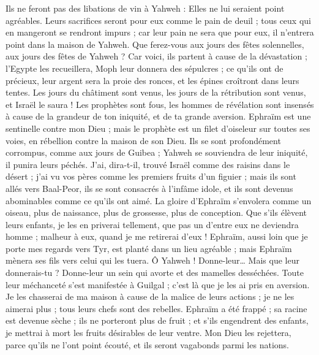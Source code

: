 \begin{multicols}{2}
Ils ne feront pas des libations de vin à Yahweh : Elles ne lui seraient point agréables. Leurs sacrifices seront pour eux comme le pain de deuil ; tous ceux qui en mangeront se rendront impurs ; car leur pain ne sera que pour eux, il n'entrera point dans la maison de Yahweh.
Que ferez-vous aux jours des fêtes solennelles, aux jours des fêtes de Yahweh ?
Car voici, ils partent à cause de la dévastation ; l'Egypte les recueillera, Moph leur donnera des sépulcres ; ce qu’ils ont de précieux, leur argent sera la proie des ronces, et les épines croîtront dans leurs tentes.
Les jours du châtiment sont venus, les jours de la rétribution sont venus, et Israël le saura ! Les prophètes sont fous, les hommes de révélation sont insensés à cause de la grandeur de ton iniquité, et de ta grande aversion.
Ephraïm est une sentinelle contre mon Dieu ; mais le prophète est un filet d'oiseleur sur toutes ses voies, en rébellion contre la maison de son Dieu.
Ils se sont profondément corrompus, comme aux jours de Guibea ; Yahweh se souviendra de leur iniquité, il punira leurs péchés.
J’ai, dira-t-il, trouvé Israël comme des raisins dans le désert ; j'ai vu vos pères comme les premiers fruits d’un figuier ; mais ils sont allés vers Baal-Peor, ils se sont consacrés à l’infâme idole, et ils sont devenus abominables comme ce qu'ils ont aimé.
La gloire d'Ephraïm s'envolera comme un oiseau, plus de naissance, plus de grossesse, plus de conception.
Que s'ils élèvent leurs enfants, je les en priverai tellement, que pas un d'entre eux ne deviendra homme ; malheur à eux, quand je me retirerai d'eux !
Ephraïm, aussi loin que je porte mes regards vers Tyr, est planté dans un lieu agréable ; mais Ephraïm mènera ses fils vers celui qui les tuera.
Ô Yahweh ! Donne-leur… Mais que leur donnerais-tu ? Donne-leur un sein qui avorte et des mamelles desséchées.
Toute leur méchanceté s’est manifestée à Guilgal ; c’est là que je les ai pris en aversion. Je les chasserai de ma maison à cause de la malice de leurs actions ; je ne les aimerai plus ; tous leurs chefs sont des rebelles.
Ephraïm a été frappé ; sa racine est devenue sèche ; ils ne porteront plus de fruit ; et s'ils engendrent des enfants, je mettrai à mort les fruits désirables de leur ventre.
Mon Dieu les rejettera, parce qu'ils ne l'ont point écouté, et ils seront vagabonds parmi les nations.

\end{multicols}
